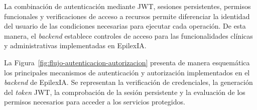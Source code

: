La combinación de autenticación mediante JWT, sesiones
persistentes, permisos funcionales y verificaciones
de acceso a recursos permite diferenciar la identidad
del usuario de las condiciones necesarias para ejecutar
cada operación. De esta manera, el \textit{backend} establece
controles de acceso para las funcionalidades clínicas
y administrativas implementadas en EpilexIA.


La Figura~\ref{fig:flujo-autenticacion-autorizacion}
presenta de manera esquemática los principales
mecanismos de autenticación y autorización
implementados en el \textit{backend} de EpilexIA.
Se representan la verificación de credenciales,
la generación del \textit{token} JWT, la comprobación
de la sesión persistente y la evaluación de
los permisos necesarios para acceder a los
servicios protegidos.




